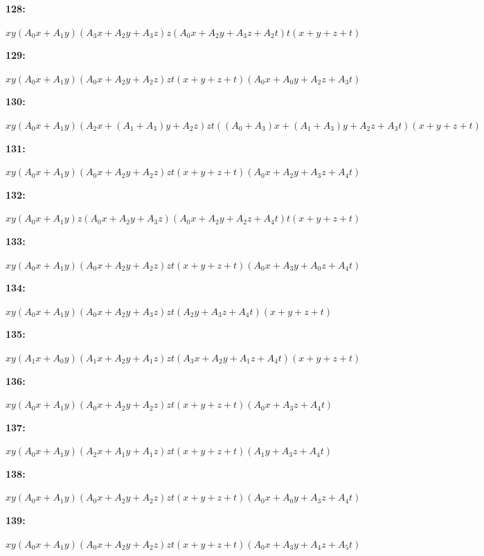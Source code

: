 \documentclass[12pt]{amsart}
\theoremstyle{plain}
\theoremstyle{remark}
\theoremstyle{definition}
\numberwithin{table}{section}
\begin{document}
\noindent\parbox[right]{9mm}{\textbf{128:}}\parbox{3mm}{\hfill}%
\parbox[t]{15cm}{\(xy(A_{0}x + A_{1}y)(A_{3}x + A_{2}y + A_{3}z)z(A_{0}x + A_{2}y + A_{3}z + A_{2}t)t(x + y + z + t)\)}

\noindent\parbox[right]{9mm}{\textbf{129:}}\parbox{3mm}{\hfill}%
\parbox[t]{15cm}{\(xy(A_{0}x + A_{1}y)(A_{0}x + A_{2}y + A_{2}z)zt(x + y + z + t)(A_{0}x + A_{0}y + A_{2}z + A_{3}t)\)}

\noindent\parbox[right]{9mm}{\textbf{130:}}\parbox{3mm}{\hfill}%
\parbox[t]{15cm}{\(xy(A_{0}x + A_{1}y)(A_{2}x + (A_{1} + A_{3})y + A_{2}z)zt((A_{0} + A_{3})x + (A_{1} + A_{3})y + A_{2}z + A_{3}t)(x + y + z + t)\)}

\noindent\parbox[right]{9mm}{\textbf{131:}}\parbox{3mm}{\hfill}%
\parbox[t]{15cm}{\(xy(A_{0}x + A_{1}y)(A_{0}x + A_{2}y + A_{2}z)zt(x + y + z + t)(A_{0}x + A_{2}y + A_{3}z + A_{4}t)\)}

\noindent\parbox[right]{9mm}{\textbf{132:}}\parbox{3mm}{\hfill}%
\parbox[t]{15cm}{\(xy(A_{0}x + A_{1}y)z(A_{0}x + A_{2}y + A_{3}z)(A_{0}x + A_{2}y + A_{2}z + A_{4}t)t(x + y + z + t)\)}

\noindent\parbox[right]{9mm}{\textbf{133:}}\parbox{3mm}{\hfill}%
\parbox[t]{15cm}{\(xy(A_{0}x + A_{1}y)(A_{0}x + A_{2}y + A_{2}z)zt(x + y + z + t)(A_{0}x + A_{3}y + A_{0}z + A_{4}t)\)}

\noindent\parbox[right]{9mm}{\textbf{134:}}\parbox{3mm}{\hfill}%
\parbox[t]{15cm}{\(xy(A_{0}x + A_{1}y)(A_{0}x + A_{2}y + A_{3}z)zt(A_{2}y + A_{3}z + A_{4}t)(x + y + z + t)\)}

\noindent\parbox[right]{9mm}{\textbf{135:}}\parbox{3mm}{\hfill}%
\parbox[t]{15cm}{\(xy(A_{1}x + A_{0}y)(A_{1}x + A_{2}y + A_{1}z)zt(A_{3}x + A_{2}y + A_{1}z + A_{4}t)(x + y + z + t)\)}

\noindent\parbox[right]{9mm}{\textbf{136:}}\parbox{3mm}{\hfill}%
\parbox[t]{15cm}{\(xy(A_{0}x + A_{1}y)(A_{0}x + A_{2}y + A_{2}z)zt(x + y + z + t)(A_{0}x + A_{3}z + A_{4}t)\)}

\noindent\parbox[right]{9mm}{\textbf{137:}}\parbox{3mm}{\hfill}%
\parbox[t]{15cm}{\(xy(A_{0}x + A_{1}y)(A_{2}x + A_{1}y + A_{1}z)zt(x + y + z + t)(A_{1}y + A_{3}z + A_{4}t)\)}

\noindent\parbox[right]{9mm}{\textbf{138:}}\parbox{3mm}{\hfill}%
\parbox[t]{15cm}{\(xy(A_{0}x + A_{1}y)(A_{0}x + A_{2}y + A_{2}z)zt(x + y + z + t)(A_{0}x + A_{0}y + A_{3}z + A_{4}t)\)}

\noindent\parbox[right]{9mm}{\textbf{139:}}\parbox{3mm}{\hfill}%
\parbox[t]{15cm}{\(xy(A_{0}x + A_{1}y)(A_{0}x + A_{2}y + A_{2}z)zt(x + y + z + t)(A_{0}x + A_{3}y + A_{4}z + A_{5}t)\)}
\end{document}
